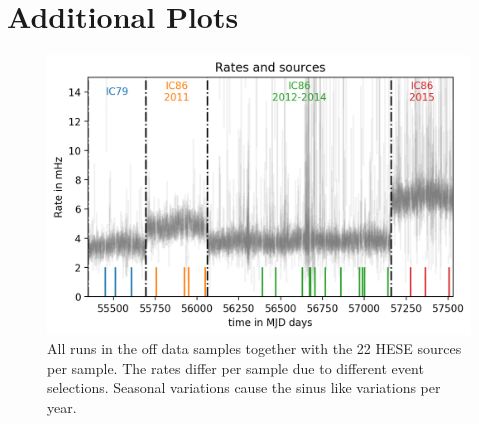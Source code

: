 \section{Additional Plots}
\begin{figure}[h]
  \centering
  \includegraphics[width=.9\textwidth]{inc/rate_all_samples.png}
  \caption{All runs in the off data samples together with the 22 HESE sources per sample. The rates differ per sample due to different event selections. Seasonal variations cause the sinus like variations per year.}
  \label{fig:rate_all_samples}
\end{figure}


